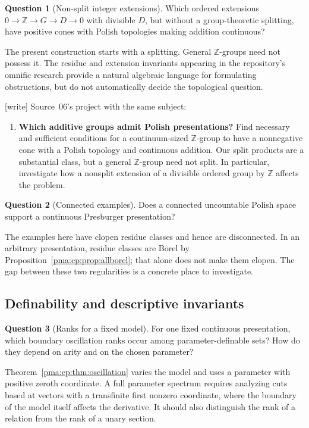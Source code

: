 \documentclass[11pt]{article}
\numberwithin{equation}{section}
\theoremstyle{definition}
\newtheorem{question}[question]{Question}
\theoremstyle{remark}
\newcommand{\Z}{\mathbb Z}
\newcommand{\writetag}{\textup{\textsf{\small[write]}}}
\begin{document}
\begin{question}[Non-split integer extensions]
Which ordered extensions $0\to\Z\to G\to D\to0$ with divisible
$D$, but without a group-theoretic splitting, have positive cones with
Polish topologies making addition continuous?
\end{question}
The present construction starts with a splitting. General $\Z$-groups
need not possess it. The residue and extension invariants appearing in
the repository's omnific research provide a natural algebraic language
for formulating obstructions, but do not automatically decide the
topological question.

\noindent\writetag{} Source~06's project with the same subject:

\begin{enumerate}[label=\textbf{\arabic*.},leftmargin=*,start=2]

\item \textbf{Which additive groups admit Polish presentations?}
Find necessary and sufficient conditions for a continuum-sized
$\Z$-group to have a nonnegative cone with a Polish topology and
continuous addition. Our split products are a substantial class,
but a general $\Z$-group need not split. In particular, investigate
how a nonsplit extension of a divisible ordered group by $\Z$
affects the problem.

\end{enumerate}

\begin{question}[Connected examples]
Does a connected uncountable Polish space support a continuous
Presburger presentation?
\end{question}
The examples here have clopen residue classes and hence are disconnected.
In an arbitrary presentation, residue classes are Borel by
Proposition~\ref{pma:cp:prop:allborel}; that alone does not make them clopen.
The gap between these two regularities is a concrete place to investigate.

\subsection{Definability and descriptive invariants}

\begin{question}[Ranks for a fixed model]
For one fixed continuous presentation, which boundary oscillation ranks
occur among parameter-definable sets? How do they depend on arity and on
the chosen parameter?
\end{question}
Theorem~\ref{pma:cp:thm:oscillation} varies the model and uses a parameter with
positive zeroth coordinate. A full parameter spectrum requires analyzing
cuts based at vectors with a transfinite first nonzero coordinate, where
the boundary of the model itself affects the derivative. It should also
distinguish the rank of a relation from the rank of a unary section.
\end{document}

